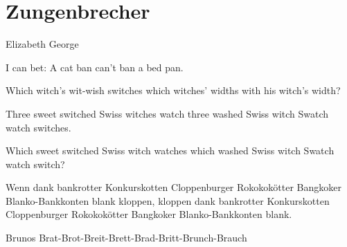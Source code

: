 \section{Zungenbrecher}

Elizabeth George

I can bet: A cat ban can't ban a bed pan.

Which witch's wit-wish switches which witches' widths with his witch's width?

Three sweet switched Swiss witches watch three washed Swiss witch Swatch watch switches. 

Which sweet switched Swiss witch watches which washed Swiss witch Swatch watch switch?


Wenn dank bankrotter Konkurskotten Cloppenburger Rokokokötter Bangkoker Blanko-Bankkonten blank kloppen, kloppen dank bankrotter Konkurskotten Cloppenburger Rokokokötter Bangkoker Blanko-Bankkonten blank.

Brunos Brat-Brot-Breit-Brett-Brad-Britt-Brunch-Brauch
